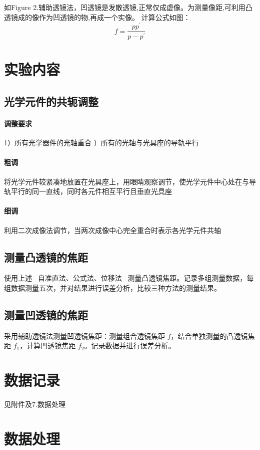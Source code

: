 \documentclass[12pt,a4paper]{article}
\begin{document}
			如Figure 2.辅助透镜法，凹透镜是发散透镜,正常仅成虚像。为测量像距,可利用凸透镜成的像作为凹透镜的物,再成一个实像。
			计算公式如图：
			\begin{equation}
				f=\frac{pp^\prime}{p-p^\prime}
			\end{equation}
		
	\section{实验内容}

	\subsection{光学元件的共轭调整}
	\paragraph{调整要求} 
	1）所有光学器件的光轴重合 ）所有的光轴与光具座的导轨平行
	\paragraph{粗调}
		将光学元件较紧凑地放置在光具座上，用眼睛观察调节，使光学元件中心处在与导轨平行的同一直线，同时各元件相互平行且垂直光具座
	\paragraph{细调}
	    利用二次成像法调节，当两次成像中心完全重合时表示各光学元件共轴
	
	\subsection{测量凸透镜的焦距}
	使用上述 \, 自准直法、公式法、位移法 \, 测量凸透镜焦距。记录多组测量数据，每组数据测量五次，并对结果进行误差分析，比较三种方法的测量结果。
	
	\subsection{测量凹透镜的焦距}
		采用辅助透镜法测量凹透镜焦距：测量组合透镜焦距 $f$，结合单独测量的凸透镜焦距 $f_1$，计算凹透镜焦距 $f_2$。记录数据并进行误差分析。


	\section{数据记录}
	见附件及7.数据处理

	\section{数据处理}
\end{document}
